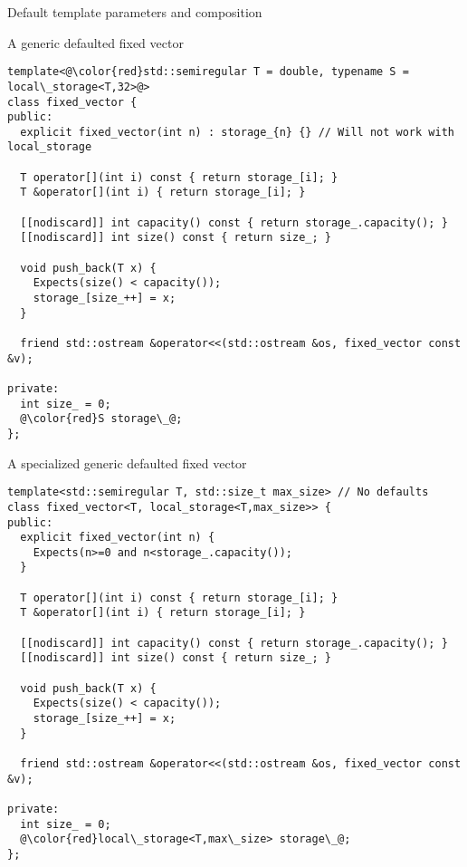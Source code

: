 \begin{frame}[t,fragile]{Default template parameters and composition}
\begin{block}{A generic defaulted fixed vector}
\begin{lstlisting}[basicstyle=\mode<presentation>{\tiny},escapechar=@]
template<@\color{red}std::semiregular T = double, typename S = local\_storage<T,32>@>
class fixed_vector {
public:
  explicit fixed_vector(int n) : storage_{n} {} // Will not work with local_storage

  T operator[](int i) const { return storage_[i]; }
  T &operator[](int i) { return storage_[i]; }

  [[nodiscard]] int capacity() const { return storage_.capacity(); }
  [[nodiscard]] int size() const { return size_; }

  void push_back(T x) {
    Expects(size() < capacity());
    storage_[size_++] = x;
  }

  friend std::ostream &operator<<(std::ostream &os, fixed_vector const &v);

private:
  int size_ = 0;
  @\color{red}S storage\_@;
};
\end{lstlisting}
\end{block}
\end{frame}

\begin{frame}[t,fragile]
\begin{block}{A specialized generic defaulted fixed vector}
\begin{lstlisting}[basicstyle=\mode<presentation>{\tiny}, escapechar=@]
template<std::semiregular T, std::size_t max_size> // No defaults
class fixed_vector<T, local_storage<T,max_size>> {
public:
  explicit fixed_vector(int n) {
    Expects(n>=0 and n<storage_.capacity());
  }

  T operator[](int i) const { return storage_[i]; }
  T &operator[](int i) { return storage_[i]; }

  [[nodiscard]] int capacity() const { return storage_.capacity(); }
  [[nodiscard]] int size() const { return size_; }

  void push_back(T x) {
    Expects(size() < capacity());
    storage_[size_++] = x;
  }

  friend std::ostream &operator<<(std::ostream &os, fixed_vector const &v);

private:
  int size_ = 0;
  @\color{red}local\_storage<T,max\_size> storage\_@;
};
\end{lstlisting}
\end{block}
\end{frame}
